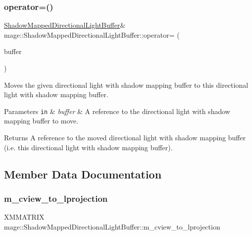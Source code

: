 \subsubsection{\texorpdfstring{operator=()}{operator=()}\hspace{0.1cm}{\footnotesize\ttfamily [2/2]}}
{\footnotesize\ttfamily \hyperlink{structmage_1_1_shadow_mapped_directional_light_buffer}{Shadow\+Mapped\+Directional\+Light\+Buffer}\& mage\+::\+Shadow\+Mapped\+Directional\+Light\+Buffer\+::operator= (\begin{DoxyParamCaption}\item[{\hyperlink{structmage_1_1_shadow_mapped_directional_light_buffer}{Shadow\+Mapped\+Directional\+Light\+Buffer} \&\&}]{buffer }\end{DoxyParamCaption})\hspace{0.3cm}{\ttfamily [default]}}

Moves the given directional light with shadow mapping buffer to this directional light with shadow mapping buffer.


\begin{DoxyParams}[1]{Parameters}
\mbox{\tt in}  & {\em buffer} & A reference to the directional light with shadow mapping buffer to move. \\
\hline
\end{DoxyParams}
\begin{DoxyReturn}{Returns}
A reference to the moved directional light with shadow mapping buffer (i.\+e. this directional light with shadow mapping buffer). 
\end{DoxyReturn}


\subsection{Member Data Documentation}
\hypertarget{structmage_1_1_shadow_mapped_directional_light_buffer_a9f9eacd19ea436e00d63ae271c4e1c42}{}\label{structmage_1_1_shadow_mapped_directional_light_buffer_a9f9eacd19ea436e00d63ae271c4e1c42} 
\subsubsection{\texorpdfstring{m\+\_\+cview\+\_\+to\+\_\+lprojection}{m\_cview\_to\_lprojection}}
{\footnotesize\ttfamily X\+M\+M\+A\+T\+R\+IX mage\+::\+Shadow\+Mapped\+Directional\+Light\+Buffer\+::m\+\_\+cview\+\_\+to\+\_\+lprojection}

